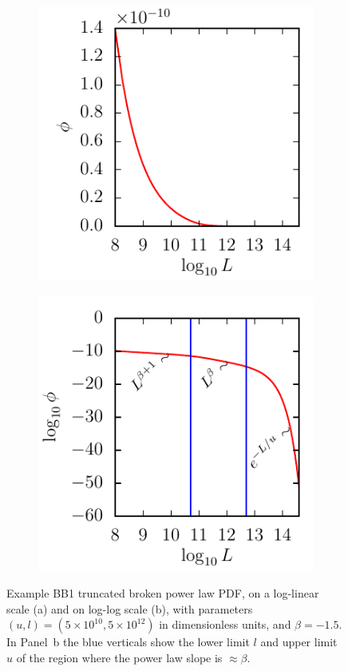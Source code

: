 \begin{figure}
	\begin{subfigure}[c]{0.45\textwidth}
		\includegraphics{fig/lumfunc_loglin}
		\caption{}
	\end{subfigure}
	\begin{subfigure}[c]{0.45\textwidth}
		\includegraphics{fig/lumfunc_loglog}
		\caption{}
	\end{subfigure}
	\caption{Example BB1 truncated broken power law PDF, on a log-linear scale (a) and on log-log scale (b), with parameters $(u,l) = (5\times 10^{10}, 5\times 10^{12})$ in dimensionless units, and $\beta = -1.5$.
	In Panel~b the blue verticals show the lower limit $l$ and upper limit $u$ of the region where the power law slope is $\approx\beta$.}
	\label{fig:lumfunc}
\end{figure}

